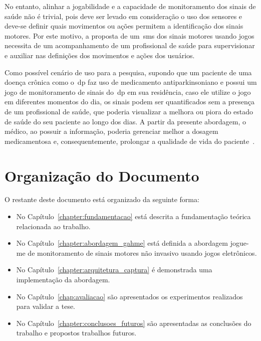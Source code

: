 No entanto, alinhar a jogabilidade e a capacidade de monitoramento dos sinais de saúde não é trivial, pois deve ser levado em consideração o uso dos sensores e deve-se definir quais movimentos ou ações permitem a identificação dos sinais motores. Por este motivo, a proposta de um~\ac{sms} dos sinais motores usando jogos necessita de um acompanhamento de um profissional de saúde para supervisionar e auxiliar nas definições dos movimentos e ações dos usuários. 


Como possível cenário de uso para a pesquisa, supondo que um paciente de uma doença crônica como o~\ac{dp} faz uso de medicamento antiparkinsoniano e possui um jogo de monitoramento de sinais do~\ac{dp} em sua residência, caso ele utilize o jogo em diferentes momentos do dia, os sinais podem ser quantificados sem a presença de um profissional de saúde, que poderia visualizar a melhora ou piora do estado de saúde do seu paciente ao longo dos dias. A partir da presente abordagem, o médico, ao possuir a informação, poderia gerenciar melhor a dosagem medicamentosa e, consequentemente, prolongar a qualidade de vida do paciente~\cite{rodrigues2006}.

\section{Organização do Documento}
O restante deste documento está organizado da seguinte forma:
\begin{itemize}
	\item No Capítulo~\ref{chapter:fundamentacao} está descrita a fundamentação teórica relacionada ao trabalho.
	\item No Capítulo~\ref{chapter:abordagem_gahme} está definida a abordagem \ac{jogue-me} de monitoramento de sinais motores não invasivo usando jogos eletrônicos.
	\item No Capítulo~\ref{chapter:arquitetura_captura} é demonstrada uma implementação da abordagem.
	\item No Capítulo~\ref{chap:avaliacao} são apresentados os experimentos realizados para validar a tese.
	\item No Capítulo~\ref{chapter:conclusoes_futuros} são apresentadas as conclusões do trabalho e propostos trabalhos futuros.
\end{itemize}
